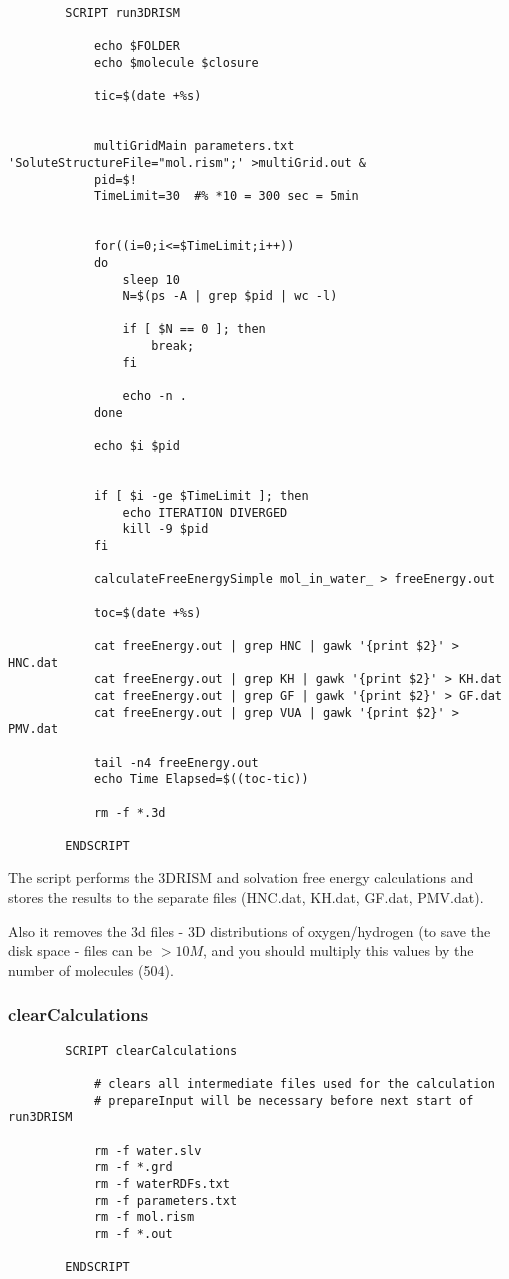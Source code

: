 \documentclass[12pt]{article}
\begin{document}
\begin{verbatim}
		SCRIPT run3DRISM

			echo $FOLDER
			echo $molecule $closure

			tic=$(date +%s)

			
			multiGridMain parameters.txt 'SoluteStructureFile="mol.rism";' >multiGrid.out &
			pid=$!
			TimeLimit=30  #% *10 = 300 sec = 5min
			

			for((i=0;i<=$TimeLimit;i++))
			do
				sleep 10
				N=$(ps -A | grep $pid | wc -l)
				
				if [ $N == 0 ]; then
					break;
				fi
	
				echo -n .
			done

			echo $i $pid

			
			if [ $i -ge $TimeLimit ]; then
				echo ITERATION DIVERGED 
				kill -9 $pid
			fi

			calculateFreeEnergySimple mol_in_water_ > freeEnergy.out

			toc=$(date +%s)

			cat freeEnergy.out | grep HNC | gawk '{print $2}' > HNC.dat
			cat freeEnergy.out | grep KH | gawk '{print $2}' > KH.dat
			cat freeEnergy.out | grep GF | gawk '{print $2}' > GF.dat
			cat freeEnergy.out | grep VUA | gawk '{print $2}' > PMV.dat

			tail -n4 freeEnergy.out
			echo Time Elapsed=$((toc-tic))

			rm -f *.3d

		ENDSCRIPT
\end{verbatim}


The script performs the 3DRISM and solvation free energy calculations and stores the results to the separate files (HNC.dat, KH.dat, GF.dat, PMV.dat).

Also it removes the 3d files - 3D distributions of oxygen/hydrogen (to save the disk space - files can be $>10 M$, and you should multiply this values by the number of molecules (504).

\subsubsection{clearCalculations}

\begin{verbatim}
		SCRIPT clearCalculations

			# clears all intermediate files used for the calculation
			# prepareInput will be necessary before next start of run3DRISM

			rm -f water.slv
			rm -f *.grd
			rm -f waterRDFs.txt
			rm -f parameters.txt
			rm -f mol.rism
			rm -f *.out

		ENDSCRIPT
\end{verbatim}
\end{document}
